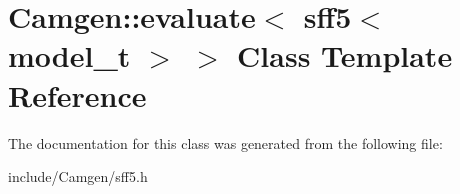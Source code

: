 \hypertarget{a00190}{}\section{Camgen\+:\+:evaluate$<$ sff5$<$ model\+\_\+t $>$ $>$ Class Template Reference}
\label{a00190}


The documentation for this class was generated from the following file\+:\begin{DoxyCompactItemize}
\item 
include/\+Camgen/sff5.\+h\end{DoxyCompactItemize}
